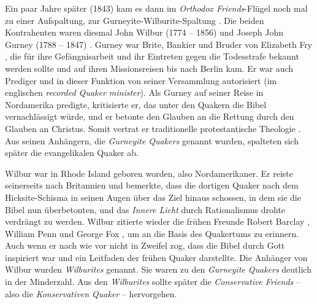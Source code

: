Ein paar Jahre später (1843) kam es dann im \textit{Orthodox Friends}-Flügel
noch mal zu einer Aufspaltung, zur Gurneyite-Wilburite-Spaltung
. Die beiden
Kontrahenten waren diesmal John Wilbur (1774 -- 1856)  und Joseph John Gurney
(1788 -- 1847) . Gurney war Brite, Bankier
 und Bruder von Elizabeth Fry , die für
ihre Gefängnisarbeit  und ihr Eintreten gegen
die Todesstrafe  bekannt werden
sollte und auf ihren Missionsreisen bis nach Berlin kam.
Er war auch Prediger  und in dieser Funktion
von seiner
Versammlung autorisiert (im englischen \textit{recorded Quaker minister}). Als
Gurney auf seiner Reise in Nordamerika predigte, kritisierte er, das unter den
Quakern die Bibel  vernachlässigt würde, und er betonte den Glauben
an die
Rettung durch den Glauben an Christus. Somit vertrat er traditionelle
protestantische Theologie . Aus seinen
Anhängern, die \textit{Gurneyite Quakers}
genannt wurden, spalteten sich später die evangelikalen Quaker
 ab.

\medskip

Wilbur war in Rhode Island  geboren worden, also
Nordamerikaner. Er reiste seinerseits
nach Britannien und bemerkte, dass die dortigen Quaker nach dem Hicksite-Schisma
in seinen Augen über das Ziel hinaus schossen, in dem sie die Bibel nun
überbetonten, und das \textit{Innere Licht} durch Rationalismus drohte verdrängt
zu werden. Wilbur zitierte wieder die frühen Freunde Robert Barclay
, William
Penn und George Fox , um an die Basis des Quakertums zu erinnern. Auch wenn er
nach wie vor nicht in Zweifel zog, dass die Bibel durch Gott inspiriert war und
ein Leitfaden der frühen Quaker darstellte. Die Anhänger von Wilbur wurden
\textit{Wilburites} genannt. Sie waren zu den
\textit{Gurneyite Quakers} deutlich in der Minderzahl.
Aus den \textit{Wilburites} sollte später die
\textit{Conservative Friends}  -- also die
\textit{Konservativen Quaker} --
hervorgehen.

\medskip

